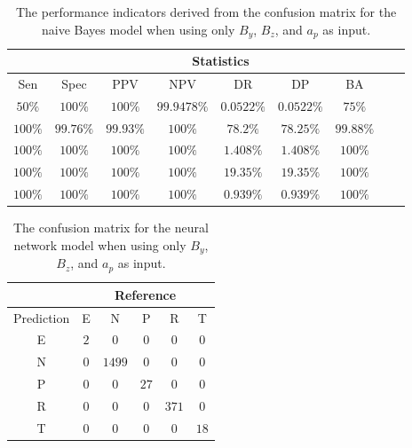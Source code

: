 \begin{table}[!ht]
	\centering
	\begin{tabular}{|c|c|c|c|c|c|c|c|c|}
		\hline
		 & \multicolumn{7}{c|}{Statistics} \\ \hline
		Sen & Spec & PPV & NPV & DR & DP & BA \\ \hline
		$50\%$ & $100\%$ & $100\%$ & $99.9478\%$ & $0.0522\%$ & $0.0522\%$ & $75\%$ \\ \hline
		$100\%$ & $99.76\%$ & $99.93\%$ & $100\%$ & $78.2\%$ & $78.25\%$ & $99.88\%$ \\ \hline
		$100\%$ & $100\%$ & $100\%$ & $100\%$ & $1.408\%$ & $1.408\%$ & $100\%$ \\ \hline
		$100\%$ & $100\%$ & $100\%$ & $100\%$ & $19.35\%$ & $19.35\%$ & $100\%$ \\ \hline
		$100\%$ & $100\%$ & $100\%$ & $100\%$ & $0.939\%$ & $0.939\%$ & $100\%$ \\ \hline
	\end{tabular}
	\caption{The performance indicators derived from the confusion matrix for the naive Bayes model when using only $B_{y}$, $B_{z}$, and $a_{p}$ as input.}
	\label{tab:cs:yzap:nb}
\end{table}

\begin{table}[!ht]
	\centering
	\begin{tabular}{|c|c|c|c|c|c|}
		\hline
		 & \multicolumn{5}{|c|}{Reference} \\ \hline
		 Prediction & E & N & P & R & T \\ \hline
		 E & $2$ & $0$ & $0$ & $0$ & $0$ \\ \hline
		 N & $0$ & $1499$ & $0$ & $0$ & $0$ \\ \hline
		 P & $0$ & $0$ & $27$ & $0$ & $0$ \\ \hline
		 R & $0$ & $0$ & $0$ & $371$ & $0$ \\ \hline
		 T & $0$ & $0$ & $0$ & $0$ & $18$ \\ \hline
	\end{tabular}
	\caption{The confusion matrix for the neural network model when using only $B_{y}$, $B_{z}$, and $a_{p}$ as input.}
	\label{tab:cm:yzap:nnet}
\end{table}

